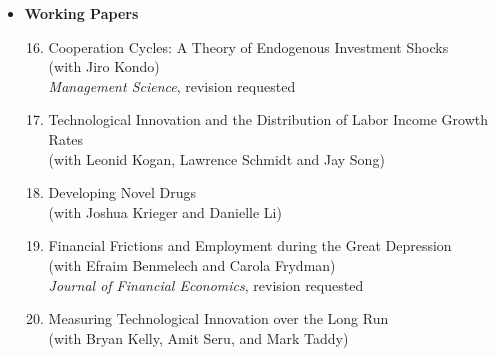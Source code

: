 \documentclass[12pt,letterpaper,serif,overlapped]{res}
\begin{document}
\begin{resume}
\begin{itemize}
\vspace{0.5cm}
\item \textbf{Working Papers}
\begin{enumerate}
\setcounter{enumi}{15}
\item Cooperation Cycles: A Theory of Endogenous Investment Shocks\\ (with Jiro Kondo)\\\emph{Management Science}, revision requested
\item Technological Innovation and the Distribution of Labor Income Growth Rates\\ (with Leonid Kogan, Lawrence Schmidt and Jay Song)
\item Developing Novel Drugs\\(with Joshua Krieger and Danielle Li)
\item Financial Frictions and Employment during the Great Depression\\ (with Efraim Benmelech and Carola Frydman)\\\emph{Journal of Financial Economics}, revision requested
\item Measuring Technological Innovation over the Long Run\\ (with Bryan Kelly, Amit Seru, and Mark Taddy)
\end{enumerate}

%

\vspace{0.5cm}


\end{itemize}
\end{resume}
\end{document}
